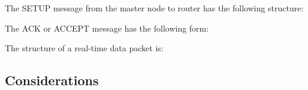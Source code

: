 \documentclass[conference, twocolumn]{IEEEtran}
\theoremstyle{definition}
\begin{document}
The SETUP message from the master node to router has the following structure:

\begin{table}[htbp]
\begin{center}
\end{center}
\caption{SETUP path message}
\label{table:PathMsg}
\end{table}

The ACK or ACCEPT message has the following form:


\begin{table}[htbp]
\begin{center}
\end{center}
\caption{SETUP path message}
\label{table:PathMsg}
\end{table}


The structure of a real-time data packet is:

\begin{table}[htbp]
\begin{center}
\end{center}
\caption{Real-time data message}
\label{table:DataMsg}
\end{table}

\subsection{Considerations}
\end{document}
